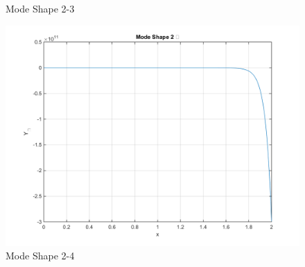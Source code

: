 \documentclass[14pt,a4paper]{article}
\begin{document}
\begin{enumerate}
\begin{figure}[htp]
		\caption{Mode Shape 2-3}
		\includegraphics[scale=0.5]{hw2_VB2_mode4.png}
		\caption{Mode Shape 2-4}
	\end{figure}	
	
\end{enumerate}
\end{document}
